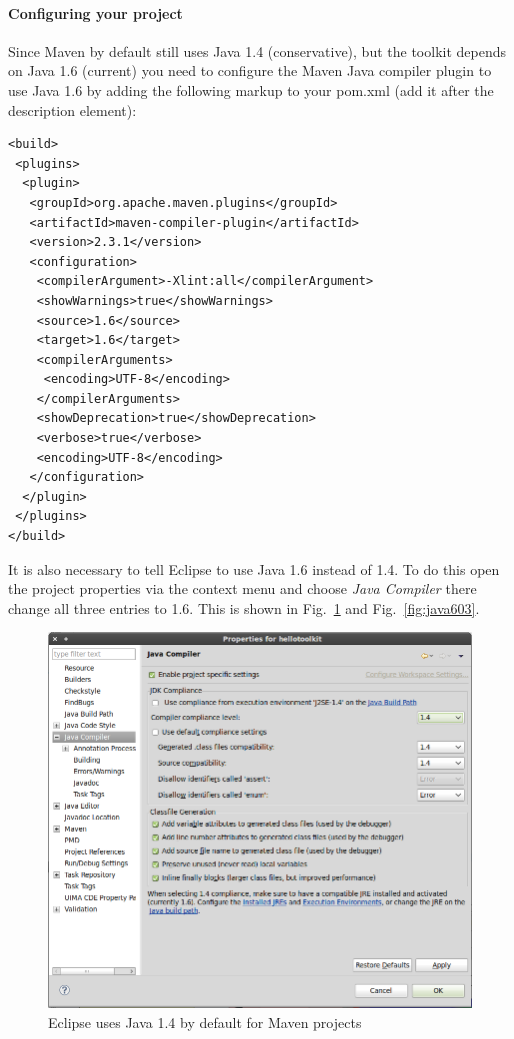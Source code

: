 \documentclass[a4paper,twoside]{book}      %
\begin{document}
\paragraph{Configuring your project} Since Maven by default still uses Java 1.4 (conservative), but the toolkit depends on Java 1.6 (current) you need to configure the Maven Java compiler plugin to use Java 1.6 by adding the following markup to your pom.xml (add it after the description element):
\begin{verbatim}
<build>
 <plugins>
  <plugin>
   <groupId>org.apache.maven.plugins</groupId>
   <artifactId>maven-compiler-plugin</artifactId>
   <version>2.3.1</version>
   <configuration>
    <compilerArgument>-Xlint:all</compilerArgument>
    <showWarnings>true</showWarnings>
    <source>1.6</source>
    <target>1.6</target>
    <compilerArguments>
     <encoding>UTF-8</encoding>
    </compilerArguments>
    <showDeprecation>true</showDeprecation>
    <verbose>true</verbose>
    <encoding>UTF-8</encoding>
   </configuration>
  </plugin>
 </plugins>
</build>
\end{verbatim}
It is also necessary to tell Eclipse to use Java 1.6 instead of 1.4. To do this open the project properties via the context menu and choose \textit{Java Compiler} there change all three entries to 1.6. This is shown in Fig.~\ref{fig:java602} and Fig.~\ref{fig:java603}.
\begin{figure}
\centering
\includegraphics[width=\textwidth]{img/ht08.png}
\caption{Eclipse uses Java 1.4 by default for Maven projects}
\label{fig:java602}
\end{figure}
\end{document}
